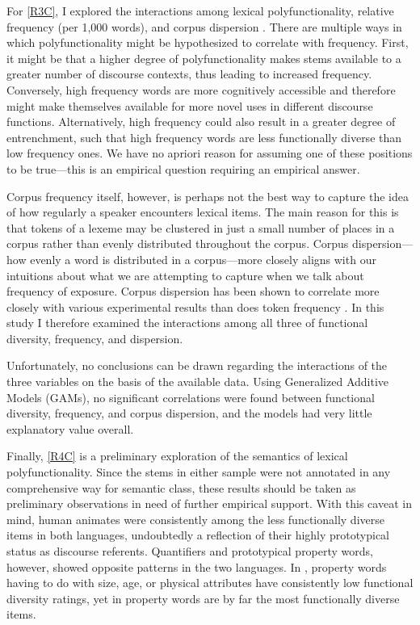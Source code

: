 For \ref{R3C}, I explored the interactions among lexical polyfunctionality, relative frequency (per 1,000 words), and corpus dispersion . There are multiple ways in which polyfunctionality might be hypothesized to correlate with frequency. First, it might be that a higher degree of polyfunctionality makes stems available to a greater number of discourse contexts, thus leading to increased frequency. Conversely, high frequency words are more cognitively accessible and therefore might make themselves available for more novel uses in different discourse functions. Alternatively, high frequency could also result in a greater degree of entrenchment, such that high frequency words are less functionally diverse than low frequency ones. We have no apriori reason for assuming one of these positions to be true—this is an empirical question requiring an empirical answer.

Corpus frequency itself, however, is perhaps not the best way to capture the idea of how regularly a speaker encounters lexical items. The main reason for this is that tokens of a lexeme may be clustered in just a small number of places in a corpus rather than evenly distributed throughout the corpus. Corpus dispersion—how evenly a word is distributed in a corpus—more closely aligns with our intuitions about what we are attempting to capture when we talk about frequency of exposure. Corpus dispersion has been shown to correlate more closely with various experimental results than does token frequency \parencites{Gries2008}{Gries2010}{Griesfc}. In this study I therefore examined the interactions among all three of functional diversity, frequency, and dispersion.

Unfortunately, no conclusions can be drawn regarding the interactions of the three variables on the basis of the available data. Using Generalized Additive Models (GAMs), no significant correlations were found between functional diversity, frequency, and corpus dispersion, and the models had very little explanatory value overall.

Finally, \ref{R4C} is a preliminary exploration of the semantics of lexical polyfunctionality. Since the stems in either sample were not annotated in any comprehensive way for semantic class, these results should be taken as preliminary observations in need of further empirical support. With this caveat in mind, human animates were consistently among the less functionally diverse items in both languages, undoubtedly a reflection of their highly prototypical status as discourse referents. Quantifiers and prototypical property words, however, showed opposite patterns in the two languages. In , property words having to do with size, age, or physical attributes have consistently low functional diversity ratings, yet in  property words are by far the most functionally diverse items.

